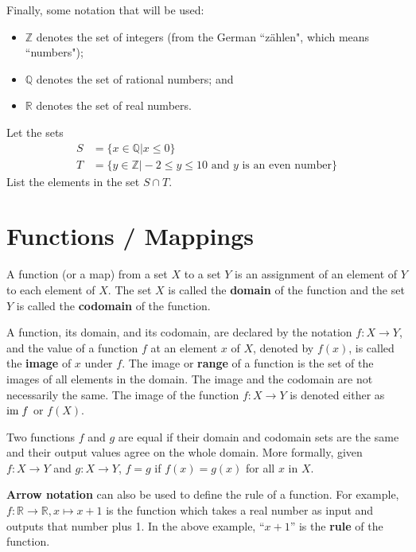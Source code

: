 Finally, some notation that will be used:
\begin{itemize}
    \item $\mathbb{Z}$ denotes the set of integers (from the German ``z\"ahlen", which means ``numbers");
    \item $\mathbb{Q}$ denotes the set of rational numbers; and
    \item $\mathbb{R}$ denotes the set of real numbers.
\end{itemize}

\begin{exercise}
    Let the sets
    \begin{align*}
        S &= \{x \in \mathbb{Q} \vert x \leq 0\}\\
        T &= \{y \in \mathbb{Z} \vert -2 \leq y \leq 10 \text{ and } y \text{ is an even number} \}
    \end{align*}
    List the elements in the set $S \cap T$.
\end{exercise}

\chapter{Functions / Mappings}
A function (or a map) from a set $X$ to a set $Y$ is an assignment of an element of $Y$ to each element of $X$. The set $X$ is called the \textbf{domain} of the function and the set $Y$ is called the \textbf{codomain} of the function.

A function, its domain, and its codomain, are declared by the notation $f: X\to Y$, and the value of a function $f$ at an element $x$ of $X$, denoted by $f(x)$, is called the \textbf{image} of $x$ under $f$. The image or \textbf{range} of a function is the set of the images of all elements in the domain. The image and the codomain are not necessarily the same. The image of the function $f: X \to Y$ is denoted either as $\mathrm{im}\; f$ or $f(X)$.

Two functions $f$ and $g$ are equal if their domain and codomain sets are the same and their output values agree on the whole domain. More formally, given $f: X \to Y$ and $g: X \to Y$, $f = g$ if $f(x) = g(x)$ for all $x$ in $X$.

\textbf{Arrow notation} can also be used to define the rule of a function. For example, $f: \mathbb{R} \to \mathbb{R}, x \mapsto x+1$ is the function which takes a real number as input and outputs that number plus 1. In the above example, ``$x + 1$'' is the \textbf{rule} of the function.

